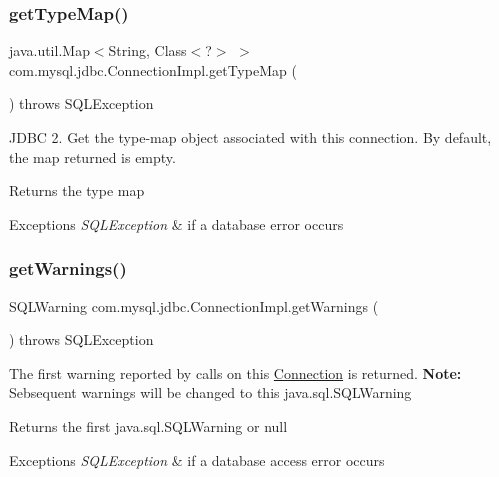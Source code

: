 \subsubsection{\texorpdfstring{get\+Type\+Map()}{getTypeMap()}}
{\footnotesize\ttfamily java.\+util.\+Map$<$String, Class$<$?$>$ $>$ com.\+mysql.\+jdbc.\+Connection\+Impl.\+get\+Type\+Map (\begin{DoxyParamCaption}{ }\end{DoxyParamCaption}) throws S\+Q\+L\+Exception}

J\+D\+BC 2. Get the type-\/map object associated with this connection. By default, the map returned is empty.

\begin{DoxyReturn}{Returns}
the type map 
\end{DoxyReturn}

\begin{DoxyExceptions}{Exceptions}
{\em S\+Q\+L\+Exception} & if a database error occurs \\
\hline
\end{DoxyExceptions}
\mbox{\label{classcom_1_1mysql_1_1jdbc_1_1_connection_impl_a2a2656c2cc08e004580f53ff19340bf1}} 
\subsubsection{\texorpdfstring{get\+Warnings()}{getWarnings()}}
{\footnotesize\ttfamily S\+Q\+L\+Warning com.\+mysql.\+jdbc.\+Connection\+Impl.\+get\+Warnings (\begin{DoxyParamCaption}{ }\end{DoxyParamCaption}) throws S\+Q\+L\+Exception}

The first warning reported by calls on this \mbox{\hyperlink{interfacecom_1_1mysql_1_1jdbc_1_1_connection}{Connection}} is returned. {\bfseries Note\+:} Sebsequent warnings will be changed to this java.\+sql.\+S\+Q\+L\+Warning

\begin{DoxyReturn}{Returns}
the first java.\+sql.\+S\+Q\+L\+Warning or null 
\end{DoxyReturn}

\begin{DoxyExceptions}{Exceptions}
{\em S\+Q\+L\+Exception} & if a database access error occurs \\
\hline
\end{DoxyExceptions}
\mbox{\label{classcom_1_1mysql_1_1jdbc_1_1_connection_impl_aa1d8937ef315e396f9acfbeea1ff8c8f}} 

